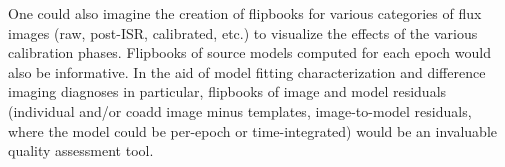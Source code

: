 One could also imagine the creation of flipbooks for various categories of flux images (raw, post-ISR, calibrated, etc.) to visualize the effects of the various calibration phases.  Flipbooks of source models computed for each epoch would also be informative.  In the aid of model fitting characterization and difference imaging diagnoses in particular, flipbooks of image and model residuals (individual and/or coadd image minus templates, image-to-model residuals, where the model could be per-epoch or time-integrated) would be an invaluable quality assessment tool.
